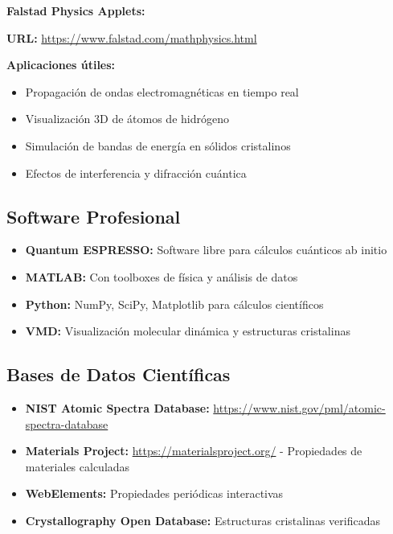 \begin{tecnologiabox}
\begin{tecnologiabox}
\begin{tecnologiabox}
\begin{tecnologiabox}
	\textbf{Falstad Physics Applets:}
	
	\textbf{URL:} \url{https://www.falstad.com/mathphysics.html}
	
	\textbf{Aplicaciones útiles:}
	\begin{itemize}
		\item Propagación de ondas electromagnéticas en tiempo real
		\item Visualización 3D de átomos de hidrógeno
		\item Simulación de bandas de energía en sólidos cristalinos
		\item Efectos de interferencia y difracción cuántica
	\end{itemize}
\end{tecnologiabox}

\subsection{Software Profesional}

\begin{itemize}
	\item \textbf{Quantum ESPRESSO:} Software libre para cálculos cuánticos ab initio
	\item \textbf{MATLAB:} Con toolboxes de física y análisis de datos
	\item \textbf{Python:} NumPy, SciPy, Matplotlib para cálculos científicos
	\item \textbf{VMD:} Visualización molecular dinámica y estructuras cristalinas
\end{itemize}

\subsection{Bases de Datos Científicas}

\begin{itemize}
	\item \textbf{NIST Atomic Spectra Database:} \url{https://www.nist.gov/pml/atomic-spectra-database}
	\item \textbf{Materials Project:} \url{https://materialsproject.org/} - Propiedades de materiales calculadas
	\item \textbf{WebElements:} Propiedades periódicas interactivas
	\item \textbf{Crystallography Open Database:} Estructuras cristalinas verificadas
\end{itemize}


\end{tecnologiabox}
\end{tecnologiabox}
\end{tecnologiabox}
